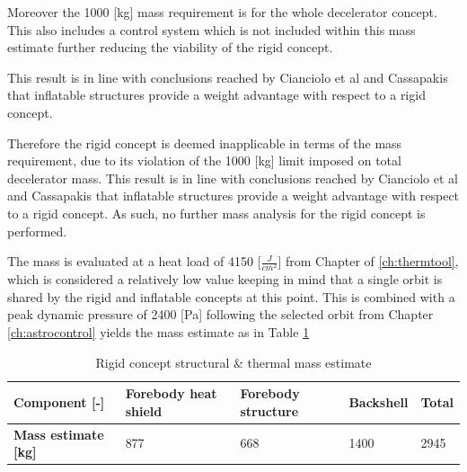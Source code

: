 Moreover the 1000 [kg] mass requirement is for the whole decelerator concept. This also includes a control system which is not included within this mass estimate further reducing the viability of the rigid concept. 

This result is in line with conclusions reached by Cianciolo et al \cite{Cianciolo2010} and Cassapakis \cite{Cassapakis1995} that inflatable structures provide a weight advantage with respect to a rigid concept.

Therefore the rigid concept is deemed inapplicable in terms of the mass requirement, due to its violation of the 1000 [kg] limit imposed on total decelerator mass. This result is in line with conclusions reached by Cianciolo et al \cite{Cianciolo2010} and Cassapakis \cite{Cassapakis1995} that inflatable structures provide a weight advantage with respect to a rigid concept. As such, no further mass analysis for the rigid concept is performed.

The mass is evaluated at a heat load of 4150 [$\frac{J}{cm^2}$] from Chapter of \ref{ch:thermtool}, which is considered a relatively low value keeping in mind that a single orbit is shared by the rigid and inflatable concepts at this point. This is combined with a peak dynamic pressure of 2400 [Pa] following the selected orbit from Chapter \ref{ch:astrocontrol} yields the mass estimate as in Table \ref{tab:strucmassrigid}

\begin{table}[h]
\centering
\caption{Rigid concept structural \& thermal mass estimate}
\begin{tabular}{|l|l|l|l|l|}
\hline
\textbf{Component {[}-{]}}                                                                                & Forebody heat shield & Forebody structure & Backshell & Total \\ \hline
\textbf{Mass estimate {[}kg{]}}                                                                          & 877           & 668          & 1400             & 2945        \\ \hline
\end{tabular}
\label{tab:strucmassrigid}
\end{table}

 


